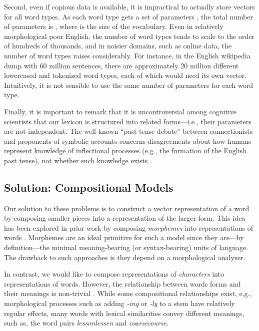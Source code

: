 \documentclass[11pt]{article}
\newcommand{\examp}[1]{\emph{#1}}
\begin{document}
\begin{CJK*}{UTF8}{gbsn}
Second, even if copious data is available, it is impractical to actually store vectors for all word types. As each word type gets a set of parameters , the total number of parameters is , where  is the size of the vocabulary. Even in relatively morphological poor English, the number of word types tends to scale to the order of hundreds of thousands, and in noisier domains, such as online data, the number of word types raises considerably. For instance, in the English wikipedia dump with 60 million sentences, there are approximately 20 million different lowercased and tokenized word types, each of which would need its own vector. Intuitively, it is not sensible to use the same number of parameters for each word type.

Finally, it is important to remark that it is uncontroversial among cognitive scientists that our lexicon is structured into related forms---i.e., their parameters are not independent. The well-known ``past tense debate'' between connectionists and proponents of symbolic accounts concerns disagreements about how humans represent knowledge of inflectional processes (e.g., the formation of the English past tense), not whether such knowledge exists \cite{mw:1998}.



\subsection{Solution: Compositional Models}
Our solution to these problems is to construct a vector representation of a word by composing smaller pieces into a representation of the larger form. This idea has been explored in prior work by composing \emph{morphemes} into representations of words \cite{W13-3512,Botha2014,soricut:2015}. Morphemes are an ideal primitive for such a model since they are---by definition---the minimal meaning-bearing (or syntax-bearing) units of language. The drawback to such approaches is they depend on a morphological analyzer.

In contrast, we would like to compose representations of \emph{characters} into representations of words. However, the relationship between words forms and their meanings is non-trivial \cite{saussure:2013}. While some compositional relationships exist, e.g., morphological processes such as adding \emph{-ing} or \emph{-ly} to a stem have relatively regular effects, many words with lexical similarities convey different meanings, such as, the word pairs \examp{lesson}\examp{lessen} and \examp{coarse}\examp{course}.


\end{CJK*}
\end{document}

